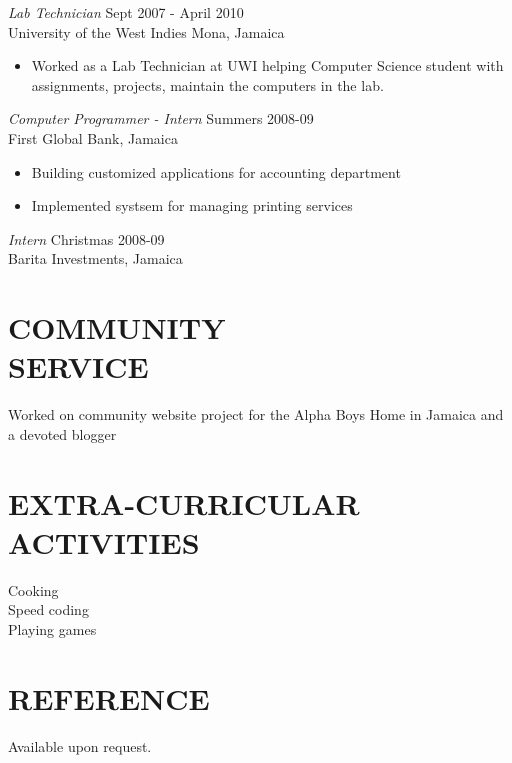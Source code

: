 \documentclass[margin]{res}
\begin{document}
\begin{resume}
                {\sl Lab Technician } \hfill        Sept 2007 - April 2010 \\
                University of the West Indies Mona, Jamaica
                  \begin{itemize}
                   \item Worked as a Lab Technician at UWI helping Computer Science student with assignments, projects, maintain the computers in the lab.
                   \end{itemize} 
                   
                {\sl Computer Programmer - Intern } \hfill        Summers 2008-09 \\
                First Global Bank, Jamaica
                  \begin{itemize}
                   \item Building customized applications for accounting department
                   \item Implemented systsem for managing printing services
                   \end{itemize} 
 
                 {\sl Intern } \hfill        Christmas 2008-09 \\
                Barita Investments, Jamaica\\
 
\section{COMMUNITY \\ SERVICE}  Worked on community website project for the Alpha Boys Home in Jamaica and a devoted blogger 

\section{EXTRA-CURRICULAR \\ ACTIVITIES}             
             Cooking \\
             Speed coding \\
             Playing games
             
 \section{REFERENCE}             
             Available upon request.

\end{resume}
\end{document}
